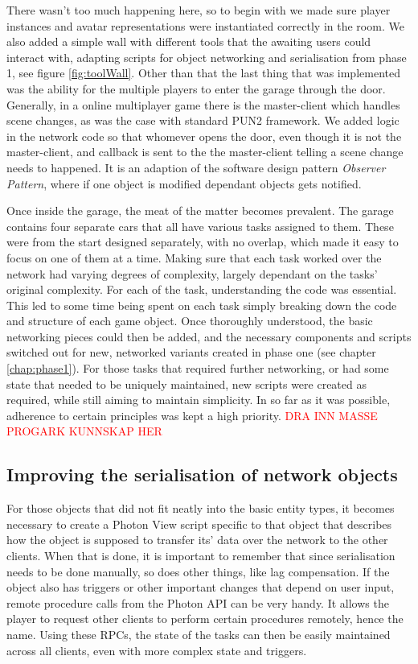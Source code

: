 There wasn't too much happening here, so to begin with we made sure player instances and avatar representations were instantiated correctly in the room. We also added a simple wall with different tools that the awaiting users could interact with, adapting scripts for object networking and serialisation from phase 1, see figure \ref{fig:toolWall}. Other than that the last thing that was implemented was the ability for the multiple players to enter the garage through the door. Generally, in a online multiplayer game there is the master-client which handles scene changes, as was the case with standard PUN2 framework. We added logic in the network code so that whomever opens the door, even though it is not the master-client, and callback is sent to the the master-client telling a scene change needs to happened. It is an adaption of the software design pattern \textit{Observer Pattern}, where if one object is modified dependant objects gets notified.    



Once inside the garage, the meat of the matter becomes prevalent. The garage contains four separate cars that all have various tasks assigned to them. These were from the start designed separately, with no overlap, which made it easy to focus on one of them at a time. Making sure that each task worked over the network had varying degrees of complexity, largely dependant on the tasks' original complexity. For each of the task, understanding the code was essential. This led to some time being spent on each task simply breaking down the code and structure of each game object. Once thoroughly understood, the basic networking pieces could then be added, and the necessary components and scripts switched out for new, networked variants created in phase one (see chapter \ref{chap:phase1}). For those tasks that required further networking, or had some state that needed to be uniquely maintained, new scripts were created as required, while still aiming to maintain simplicity.  In so far as it was possible, adherence to certain principles was kept a high priority. \textcolor{red}{DRA INN MASSE PROGARK KUNNSKAP HER}


\subsection{Improving the serialisation of network objects}
For those objects that did not fit neatly into the basic entity types, it becomes necessary to create a Photon View script specific to that object that describes how the object is supposed to transfer its' data over the network to the other clients. When that is done, it is important to remember that since serialisation needs to be done manually, so does other things, like lag compensation. If the object also has triggers or other important changes that depend on user input, remote procedure calls from the Photon API can be very handy. It allows the player to request other clients to perform certain procedures remotely, hence the name. Using these RPCs, the state of the tasks can then be easily maintained across all clients, even with more complex state and triggers.



